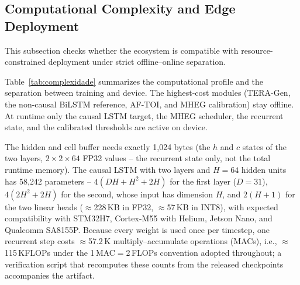 \documentclass[a4paper,fleqn]{cas-dc}
\newcommand{\TERAGen}{\mbox{TERA-Gen}\xspace}
\newcommand{\AFTOI}{\mbox{AF-TOI}\xspace}
\newcommand{\MHEG}{\mbox{MHEG}\xspace}
\begin{document}
\subsection{Computational Complexity and Edge Deployment}
\label{sec:complexidade}
This subsection checks whether the ecosystem is compatible with resource-constrained deployment under strict offline--online separation.

Table~\ref{tab:complexidade} summarizes the computational profile and the
separation between training and device. The highest-cost modules (\TERAGen, the
non-causal BiLSTM reference, \AFTOI, and \MHEG calibration) stay offline. At
runtime only the causal LSTM target, the \MHEG scheduler, the recurrent state,
and the calibrated thresholds are active on device.

The hidden and cell buffer needs exactly 1,024 bytes {\color{\revcolor}(the $h$ and $c$ states of the two layers, $2 \times 2 \times 64$ FP32 values -- the recurrent state only, not the total runtime memory)}. The causal
LSTM with two layers and $H{=}64$ hidden units has {\color{\revcolor}58{,}242
parameters -- $4(DH{+}H^2{+}2H)$ for the first layer ($D{=}31$),
$4(2H^2{+}2H)$ for the second, whose input has dimension $H$, and $2(H{+}1)$
for the two linear heads} ($\approx$228\,KB in FP32, $\approx$57\,KB in INT8),
with expected compatibility with STM32H7, Cortex-M55 with Helium, Jetson Nano,
and Qualcomm SA8155P. {\color{\revcolor}Because every weight is used once per
timestep, one recurrent step costs $\approx$57.2\,K multiply--accumulate
operations (MACs), i.e., $\approx$115\,KFLOPs under the 1\,MAC${}={}$2\,FLOPs
convention adopted throughout; a verification script that recomputes these
counts from the released checkpoints accompanies the artifact.}
\end{document}
